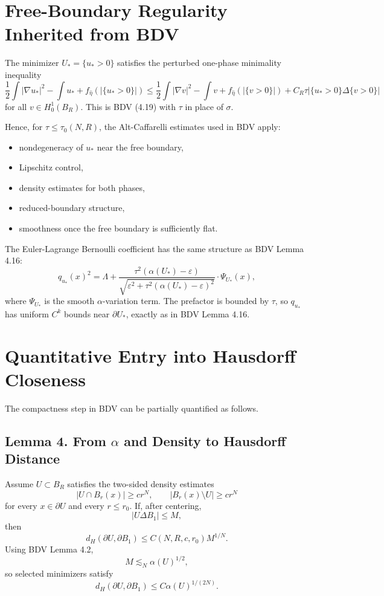 \documentclass[11pt]{article}
\begin{document}
\section{Free-Boundary Regularity Inherited from BDV}

The minimizer \(U_*=\{u_*>0\}\) satisfies the perturbed one-phase minimality
inequality
\[
\frac12\int |\nabla u_*|^2-\int u_*
+f_{\hat\eta}(|\{u_*>0\}|)
\le
\frac12\int |\nabla v|^2-\int v
+f_{\hat\eta}(|\{v>0\}|)
+C_R\tau|\{u_*>0\}\Delta\{v>0\}|
\]
for all \(v\in H^1_0(B_R)\). This is BDV (4.19) with \(\tau\) in place of
\(\sigma\).

Hence, for \(\tau\le\tau_0(N,R)\), the Alt-Caffarelli estimates used in BDV
apply:
\begin{itemize}
\item nondegeneracy of \(u_*\) near the free boundary,
\item Lipschitz control,
\item density estimates for both phases,
\item reduced-boundary structure,
\item smoothness once the free boundary is sufficiently flat.
\end{itemize}

The Euler-Lagrange Bernoulli coefficient has the same structure as BDV Lemma
4.16:
\[
q_{u_*}(x)^2
=
\Lambda
+
\frac{\tau^2(\alpha(U_*)-\varepsilon)}
{\sqrt{\varepsilon^2+\tau^2(\alpha(U_*)-\varepsilon)^2}}
\cdot
\Psi_{U_*}(x),
\]
where \(\Psi_{U_*}\) is the smooth \(\alpha\)-variation term. The prefactor is
bounded by \(\tau\), so \(q_{u_*}\) has uniform \(C^k\) bounds near
\(\partial U_*\), exactly as in BDV Lemma 4.16.

\section{Quantitative Entry into Hausdorff Closeness}

The compactness step in BDV can be partially quantified as follows.

\subsection*{Lemma 4. From \(\alpha\) and Density to Hausdorff Distance}

Assume \(U\subset B_R\) satisfies the two-sided density estimates
\[
|U\cap B_r(x)|\ge c r^N,\qquad
|B_r(x)\setminus U|\ge c r^N
\]
for every \(x\in\partial U\) and every \(r\le r_0\). If, after centering,
\[
|U\Delta B_1|\le M,
\]
then
\[
d_H(\partial U,\partial B_1)
\le
C(N,R,c,r_0) M^{1/N}.
\]
Using BDV Lemma 4.2,
\[
M\lesssim_N \alpha(U)^{1/2},
\]
so selected minimizers satisfy
\[
d_H(\partial U,\partial B_1)
\le
C\alpha(U)^{1/(2N)}.
\]
\end{document}
